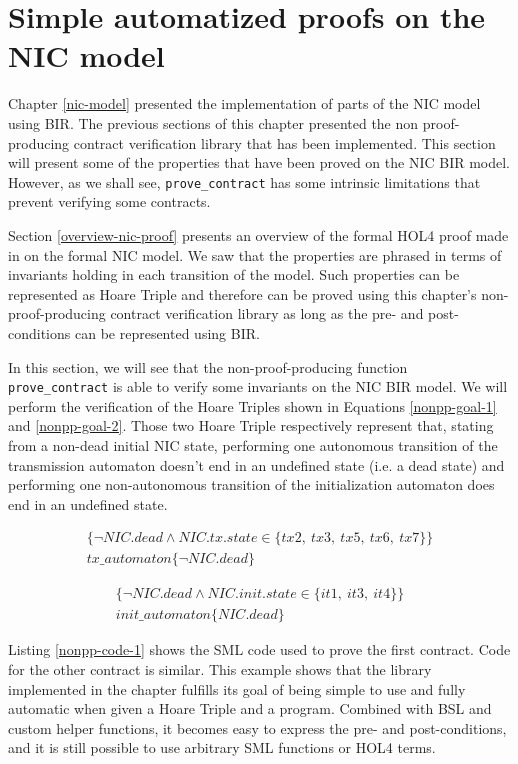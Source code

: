 \documentclass{kththesis}
\begin{document}
{\section{Simple automatized proofs on the NIC model} \label{simple-automated-proofs-on-nic}

Chapter \ref{nic-model} presented the implementation of parts of the NIC model using BIR. The previous sections of this chapter presented the non \gls{proof-producing} contract verification library that has been implemented. This section will present some of the properties that have been proved on the NIC BIR model. However, as we shall see, \texttt{prove\_contract} has some intrinsic limitations that prevent verifying some contracts.

Section \ref{overview-nic-proof} presents an overview of the formal HOL4 proof made in \cite{haglund_formal_2016} on the formal NIC model. We saw that the properties are phrased in terms of invariants holding in each transition of the model. Such properties can be represented as Hoare Triple and therefore can be proved using this chapter's non-proof-producing contract verification library as long as the pre- and post-conditions can be represented using BIR.

In this section, we will see that the non-proof-producing function \texttt{prove\_contract} is able to verify some invariants on the NIC BIR model. We will perform the verification of the Hoare Triples shown in Equations \ref{nonpp-goal-1} and \ref{nonpp-goal-2}. Those two Hoare Triple respectively represent that, stating from a non-dead initial NIC state, performing one autonomous transition of the transmission automaton doesn't end in an undefined state (i.e. a dead state) and performing one non-autonomous transition of the initialization automaton does end in an undefined state.

\begin{multline}
	\{\neg NIC.dead \land NIC.tx.state \in \{tx2,~tx3,~tx5,~tx6,~tx7\}\}\\
	tx\_automaton\{\neg NIC.dead\}
    \label{nonpp-goal-1}
\end{multline}

\begin{multline}
	\{\neg NIC.dead \land NIC.init.state \in \{it1,~it3,~it4\}\}\\
	init\_automaton\{NIC.dead\}
    \label{nonpp-goal-2}
\end{multline}

Listing \ref{nonpp-code-1} shows the SML code used to prove the first contract. Code for the other contract is similar. This example shows that the library implemented in the chapter fulfills its goal of being simple to use and fully automatic when given a Hoare Triple and a program. Combined with BSL and custom helper functions, it becomes easy to express the pre- and post-conditions, and it is still possible to use arbitrary SML functions or HOL4 terms.

}
\end{document}
